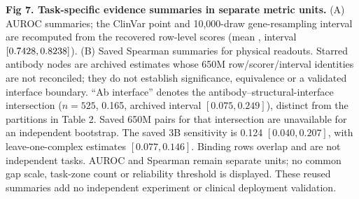 \caption{{\bf Fig 7. Task-specific evidence summaries in separate metric units.} (A) AUROC summaries; the ClinVar point and 10,000-draw gene-resampling interval are recomputed from the recovered row-level scores (mean \ClinicalMacroAUC{}, interval $[\ClinicalMacroLow,\ClinicalMacroHigh]$). (B) Saved Spearman summaries for physical readouts. Starred antibody nodes are archived estimates whose 650M row/scorer/interval identities are not reconciled; they do not establish significance, equivalence or a validated interface boundary. ``Ab interface'' denotes the antibody--structural-interface intersection ($n=525$, 0.165, archived interval $[0.075,0.249]$), distinct from the partitions in Table 2. Saved 650M pairs for that intersection are unavailable for an independent bootstrap. The saved 3B sensitivity is 0.124 $[0.040,0.207]$, with leave-one-complex estimates $[0.077,0.146]$. Binding rows overlap and are not independent tasks. AUROC and Spearman remain separate units; no common gap scale, task-zone count or reliability threshold is displayed. These reused summaries add no independent experiment or clinical deployment validation.}
